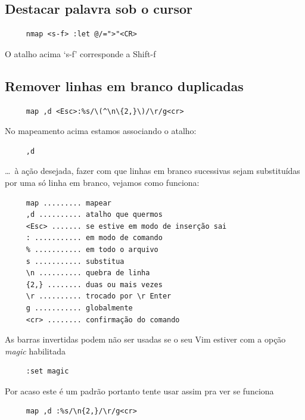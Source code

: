 \documentclass[10pt,a4paper,openany]{book}
\begin{document}
\subsection{Destacar palavra sob o cursor }
\label{Destacar palavra sob o cursor }

\begin{verbatim}
     nmap <s-f> :let @/=">"<CR>
\end{verbatim}

O atalho acima `s-f' corresponde a Shift-f

\subsection{Remover linhas em branco duplicadas }
\label{Remover linhas em branco duplicadas }

\begin{verbatim}
     map ,d <Esc>:%s/\(^\n\{2,}\)/\r/g<cr>
\end{verbatim}

No mapeamento acima estamos associando o atalho:

\begin{verbatim}
     ,d
\end{verbatim}

\dots~à ação desejada, fazer com que linhas em branco sucessivas sejam
substituídas por uma só linha em branco, vejamos como funciona:

\begin{verbatim}
     map ......... mapear
     ,d .......... atalho que quermos
     <Esc> ....... se estive em modo de inserção sai
     : ........... em modo de comando
     % ........... em todo o arquivo
     s ........... substitua
     \n .......... quebra de linha
     {2,} ........ duas ou mais vezes
     \r .......... trocado por \r Enter
     g ........... globalmente
     <cr> ........ confirmação do comando
\end{verbatim}

As barras invertidas podem não ser usadas se o seu Vim estiver com a opção
{\em magic} habilitada

\begin{verbatim}
     :set magic
\end{verbatim}

Por acaso este é um padrão portanto tente usar assim pra ver se funciona

\begin{verbatim}
     map ,d :%s/\n{2,}/\r/g<cr>
\end{verbatim}
\end{document}
